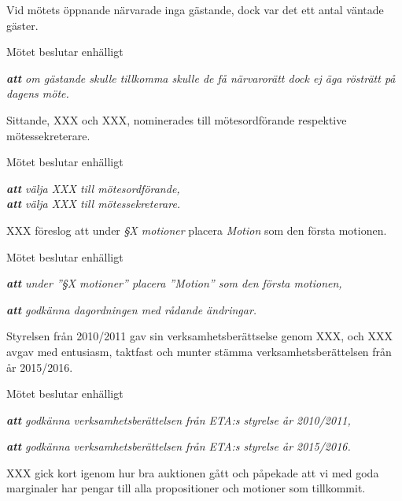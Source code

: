 
Vid mötets öppnande närvarade inga gästande, dock var det ett antal väntade gäster.

Mötet beslutar enhälligt

\emph{\textbf{att} om  gästande skulle tillkomma skulle de få närvarorätt dock ej äga rösträtt på dagens möte.}






Sittande, XXX och XXX, nominerades till \newline mötesordförande respektive mötessekreterare. 

Mötet beslutar enhälligt

\emph{\textbf{att} välja XXX till mötesordförande,}\\
\emph{\textbf{att} välja XXX till mötessekreterare.}



\newpage


XXX föreslog att under \emph{§X motioner} placera \emph{Motion } som den första motionen.

Mötet beslutar enhälligt

\emph{\textbf{att} under ''§X  motioner'' placera ''Motion'' som den första motionen,}

\emph{\textbf{att} godkänna dagordningen med rådande ändringar.}






\sect[Verksamhetsberättelser]

Styrelsen från 2010/2011 gav sin verksamhetsberättselse genom XXX, och XXX avgav med entusiasm, taktfast och munter stämma verksamhetsberättelsen från år 2015/2016. 


Mötet beslutar enhälligt

\emph{\textbf{att} godkänna verksamhetsberättelsen från ETA:s styrelse år 2010/2011,}

\emph{\textbf{att} godkänna verksamhetsberättelsen från ETA:s styrelse år 2015/2016.}



XXX gick kort igenom hur bra auktionen gått och påpekade att vi med goda marginaler har pengar till alla propositioner och motioner som tillkommit.


